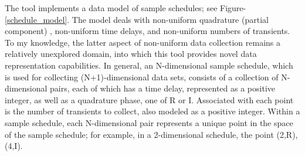 The tool implements a data model of sample schedules; see 
Figure-\ref{schedule_model}.  The model deals with non-uniform quadrature
(partial component) \cite{maciejewski2011random}, non-uniform time delays, 
and non-uniform numbers of transients.  To my knowledge, the latter aspect of
non-uniform data collection remains a relatively unexplored domain, into
which this tool provides novel data representation capabilities.  In general,
an N-dimensional sample schedule, which is used for collecting (N+1)-dimensional
data sets, consists of a collection of N-dimensional pairs, each of which
has a time delay, represented as a positive integer, as well as a quadrature
phase, one of R or I.  Associated with each point is the number of transients
to collect, also modeled as a positive integer.  Within a sample schedule,
each N-dimensional pair represents a unique point in the space of the sample
schedule; for example, in a 2-dimensional schedule, the point (2,R),(4,I). 

